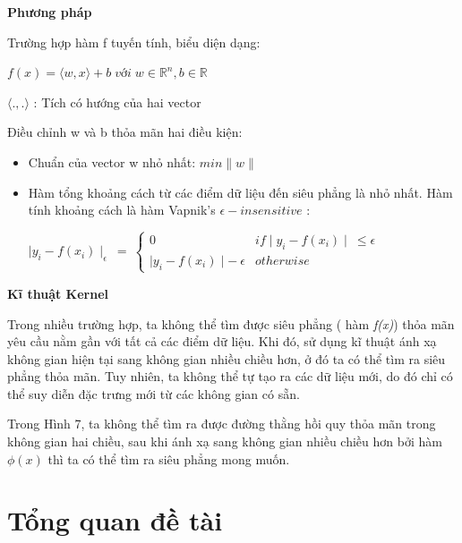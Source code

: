 \documentclass[12pt]{extarticle}
\begin{document}
			\par \textbf{Phương pháp}
			\par Trường hợp hàm f tuyến tính, biểu diện dạng:
			\begin{center}
				$f(x)=\langle w,x\rangle + b \;với \;w\in \mathbb{R}^{n}, b\in \mathbb{R}$
				\par $\langle .,.\rangle$ : Tích có hướng của hai vector
			\end{center}
			\par Điều chỉnh w và b thỏa mãn hai điều kiện:
				\begin{itemize}
					\item Chuẩn của vector w nhỏ nhất: $min \parallel w\parallel$
					\item Hàm tổng khoảng cách từ các điểm dữ liệu đến siêu phẳng là nhỏ nhất. Hàm tính khoảng cách là hàm Vapnik’s $\epsilon-insensitive$ : 
					\begin{center}
						$\mid y_{i} - f(x_{i})\mid_{\epsilon} \:=\:\begin{cases}0 &  if \mid y_{i} - f(x_{i})\mid \:\leq \epsilon\\\mid y_{i} - f(x_{i})\mid - \: \epsilon & otherwise\end{cases} $ 
					\end{center}
				\end{itemize}
			\par \textbf{Kĩ thuật Kernel}
			\par Trong nhiều trường hợp, ta không thể tìm được siêu phẳng ( hàm \textit{f(x)}) thỏa mãn yêu cầu nằm gần với tất cả các điểm dữ liệu. Khi đó, sử dụng kĩ thuật ánh xạ không gian hiện tại sang không gian nhiều chiều hơn, ở đó ta có thể tìm ra siêu phẳng thỏa mãn. Tuy nhiên, ta không thể tự tạo ra các dữ liệu mới, do đó chỉ có thể suy diễn đặc trưng mới từ các không gian có sẵn.
			\par Trong Hình 7, ta không thể tìm ra được đường thằng hồi quy thỏa mãn trong không gian hai chiều, sau khi ánh xạ sang không gian nhiều chiều hơn bởi hàm $\phi(x)$ thì ta có thể tìm ra siêu phẳng mong muốn.
	\section{Tổng quan đề tài}
\end{document}
